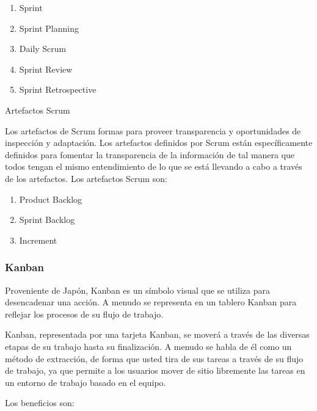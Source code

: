 \documentclass[a4paper,11pt]{article}
\begin{document}
\begin{enumerate}
  \item Sprint
  \item Sprint Planning
  \item Daily Scrum
  \item Sprint Review
  \item Sprint Retrospective
\end{enumerate}
Artefactos Scrum

Los artefactos de Scrum formas para proveer transparencia y oportunidades de inspección y adaptación. Los artefactos definidos por Scrum están específicamente definidos para fomentar la transparencia de la información de tal manera que todos tengan el mismo entendimiento de lo que se está llevando a cabo a través de los artefactos. Los artefactos Scrum son:

\begin{enumerate}
  \item Product Backlog
  \item Sprint Backlog
  \item Increment
\end{enumerate}

\subsubsection{Kanban}

Proveniente de Japón, Kanban es un símbolo visual que se utiliza para desencadenar una acción. A menudo se representa en un tablero Kanban para reflejar los procesos de su flujo de trabajo.

Kanban, representada por una tarjeta Kanban, se moverá a través de las diversas etapas de su trabajo hasta su finalización. A menudo se habla de él como un método de extracción, de forma que usted tira de sus tareas a través de su flujo de trabajo, ya que permite a los usuarios mover de sitio libremente las tareas en un entorno de trabajo basado en el equipo.

Los beneficios son:
\end{document}
